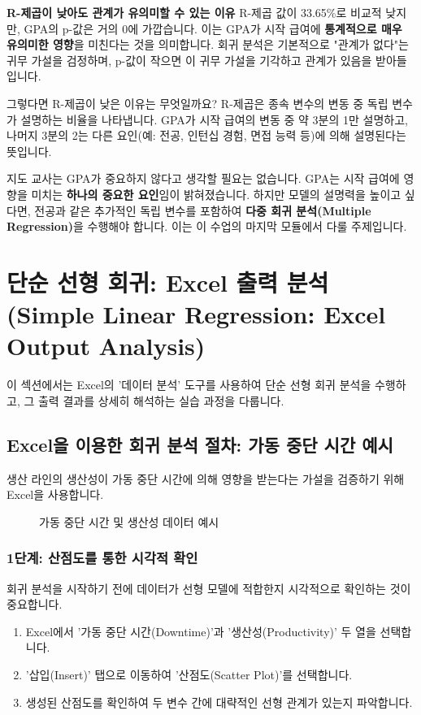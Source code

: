 \documentclass[11pt,a4paper]{article}
\theoremstyle{definition}
\begin{document}
\begin{cautionbox}
\textbf{R-제곱이 낮아도 관계가 유의미할 수 있는 이유}
R-제곱 값이 33.65\%로 비교적 낮지만, GPA의 p-값은 거의 0에 가깝습니다. 이는 GPA가 시작 급여에 \textbf{통계적으로 매우 유의미한 영향}을 미친다는 것을 의미합니다. 회귀 분석은 기본적으로 "관계가 없다"는 귀무 가설을 검정하며, p-값이 작으면 이 귀무 가설을 기각하고 관계가 있음을 받아들입니다.

그렇다면 R-제곱이 낮은 이유는 무엇일까요? R-제곱은 종속 변수의 변동 중 독립 변수가 설명하는 비율을 나타냅니다. GPA가 시작 급여의 변동 중 약 3분의 1만 설명하고, 나머지 3분의 2는 다른 요인(예: 전공, 인턴십 경험, 면접 능력 등)에 의해 설명된다는 뜻입니다.

지도 교사는 GPA가 중요하지 않다고 생각할 필요는 없습니다. GPA는 시작 급여에 영향을 미치는 \textbf{하나의 중요한 요인}임이 밝혀졌습니다. 하지만 모델의 설명력을 높이고 싶다면, 전공과 같은 추가적인 독립 변수를 포함하여 \textbf{다중 회귀 분석(Multiple Regression)}을 수행해야 합니다. 이는 이 수업의 마지막 모듈에서 다룰 주제입니다.
\end{cautionbox}

\newpage
\section{단순 선형 회귀: Excel 출력 분석 (Simple Linear Regression: Excel Output Analysis)}
이 섹션에서는 Excel의 '데이터 분석' 도구를 사용하여 단순 선형 회귀 분석을 수행하고, 그 출력 결과를 상세히 해석하는 실습 과정을 다룹니다.

\subsection{Excel을 이용한 회귀 분석 절차: 가동 중단 시간 예시}
생산 라인의 생산성이 가동 중단 시간에 의해 영향을 받는다는 가설을 검증하기 위해 Excel을 사용합니다.

\begin{figure}[h!]
    \centering
    \caption{가동 중단 시간 및 생산성 데이터 예시}
    \label{fig:downtime_data}
\end{figure}

\subsubsection{1단계: 산점도를 통한 시각적 확인}
회귀 분석을 시작하기 전에 데이터가 선형 모델에 적합한지 시각적으로 확인하는 것이 중요합니다.
\begin{enumerate}
    \item Excel에서 '가동 중단 시간(Downtime)'과 '생산성(Productivity)' 두 열을 선택합니다.
    \item '삽입(Insert)' 탭으로 이동하여 '산점도(Scatter Plot)'를 선택합니다.
    \item 생성된 산점도를 확인하여 두 변수 간에 대략적인 선형 관계가 있는지 파악합니다.
\end{enumerate}
\end{document}
